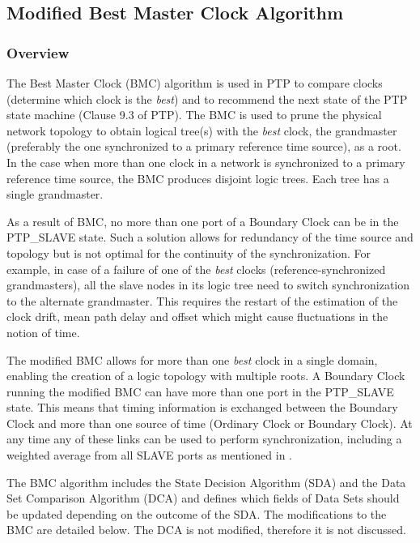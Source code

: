 \documentclass[a4paper, 12pt]{article}
\begin{document}



\subsection{Modified Best Master Clock Algorithm}
\label{sec:wrBMC}

\subsubsection{Overview}
The Best Master Clock (BMC) algorithm is used in PTP to compare clocks (determine which 
clock is the \textit{best}) and to recommend the next state of the PTP state machine (Clause 9.3 
of PTP). The BMC is used to prune the physical network topology to obtain logical tree(s) with the
\textit{best} clock, the grandmaster (preferably the one synchronized to a primary reference time 
source), as a root. In the case when more than one clock in a network is synchronized to a primary 
reference time source, the BMC produces disjoint logic trees. Each tree has a single grandmaster. 

As a result of BMC, no more than one port of a Boundary Clock can be in the PTP\_SLAVE state. Such a
solution allows for redundancy of the time source and topology but is not optimal for the continuity 
of the synchronization. For example, in case of a failure of one of the \textit{best} clocks
(reference-synchronized grandmasters), all the slave nodes in its logic tree need to switch 
synchronization to the alternate grandmaster. This requires the restart of the estimation of the 
clock drift, mean path delay and offset which might cause fluctuations in the notion of time. 

The modified BMC allows for more than one \textit{best} clock in a single domain, enabling the 
creation of a logic topology with multiple roots. A Boundary Clock running the modified BMC can have 
more than one port in the PTP\_SLAVE state. This means that timing information is exchanged between 
the Boundary Clock and more than one source of time (Ordinary Clock or Boundary Clock). At any time 
any of these links can be used to perform synchronization, including a weighted average from all 
SLAVE ports as mentioned in \cite{Takahide}.

The BMC algorithm includes the State Decision Algorithm (SDA) and the Data Set Comparison
Algorithm (DCA) and defines which fields of Data Sets should be updated depending on the outcome of
the SDA. The modifications to the BMC are detailed below. The DCA is not modified, therefore it is not
discussed.
\end{document}
